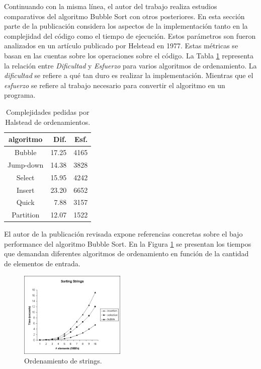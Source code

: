 \documentclass[conference]{IEEEtran}
\begin{document}
Continuando con la misma línea, el autor del trabajo realiza estudios
comparativos del algoritmo Bubble Sort con otros posteriores. En esta
sección parte de la publicación considera los aspectos de la
implementación tanto en la complejidad del código como el tiempo de
ejecución. Estos parámetros son fueron analizados en un artículo
publicado por Helstead en 1977. Estas métricas se basan en las cuentas
sobre los operaciones sobre el código. La Tabla \ref{tab:measure}
representa la relación entre \emph{Dificultad} y \emph{Esfuerzo} para
varios algoritmos de ordenamiento. La \emph{dificultad} se refiere a
qué tan duro es realizar la implementación. Mientras que el
\emph{esfuerzo} se refiere al trabajo necesario para convertir el
algoritmo en un programa.
\begin{table}[ht]
  \renewcommand{\arraystretch}{1.3}
  \caption{Complejidades pedidas por Halstead de ordenamientos.}
  \label{tab:measure}
  \centering
  \begin{tabular}{|c|r|r|}
    \hline
    \textbf{algoritmo} & \textbf{Dif.} & \textbf{Esf.} \\
    \hline
    Bubble    & 17.25 & 4165 \\
    Jump-down & 14.38 & 3828 \\
    Select    & 15.95 & 4242 \\
    Insert    & 23.20 & 6652 \\
    Quick     & 7.88  & 3157 \\
    Partition & 12.07 & 1522 \\
    \hline
  \end{tabular}
\end{table}

El autor de la publicación revisada expone referencias concretas sobre
el bajo performance del algoritmo Bubble Sort. En la Figura
\ref{fig:performance} se presentan los tiempos que demandan diferentes
algoritmos de ordenamiento en función de la cantidad de elementos de
entrada. 
\begin{figure}[ht]
  \centering
  \includegraphics[width=0.45\textwidth]{img/performance}
  \caption{Ordenamiento de strings.}
  \label{fig:performance}
\end{figure}
\end{document}
